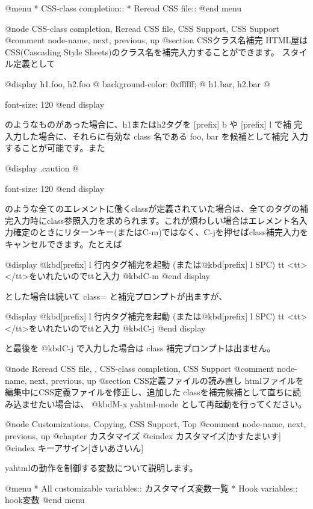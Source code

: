 @menu
* CSS-class completion::        
* Reread CSS file::             
@end menu

@node CSS-class completion, Reread CSS file, CSS Support, CSS Support
@comment  node-name,  next,  previous,  up
@section CSSクラス名補完
HTML屋はCSS(Cascading Style Sheets)のクラス名を補完入力することができます。
スタイル定義として

@display
 h1.foo, h2.foo @{ background-color: 0xffffff; @}
 h1.bar, h2.bar @{ font-size: 120%
@end display

のようなものがあった場合に、h1またはh2タグを [prefix] b や [prefix] l で補
完入力した場合に、それらに有効な class 名である foo, bar を候補として補完
入力することが可能です。また

@display
 .caution @{ font-size: 120%
@end display

のような全てのエレメントに働くclassが定義されていた場合は、全てのタグの補
完入力時にclass参照入力を求められます。これが煩わしい場合はエレメント名入
力確定のときにリターンキー(またはC-m)ではなく、C-jを押せばclass補完入力を
キャンセルできます。たとえば

@display
 @kbd{[prefix] l}                    行内タグ補完を起動
    (または@kbd{[prefix] l SPC})
 tt                                  <tt></tt>をいれたいのでttと入力
 @kbd{C-m}
@end display

とした場合は続いて class= と補完プロンプトが出ますが、

@display
 @kbd{[prefix] l}                    行内タグ補完を起動
    (または@kbd{[prefix] l SPC})
 tt                                  <tt></tt>をいれたいのでttと入力
 @kbd{C-j}
@end display

と最後を @kbd{C-j} で入力した場合は class 補完プロンプトは出ません。

@node Reread CSS file,  , CSS-class completion, CSS Support
@comment  node-name,  next,  previous,  up
@section CSS定義ファイルの読み直し
htmlファイルを編集中にCSS定義ファイルを修正し、追加した
classを補完候補として直ちに読み込ませたい場合は、
@kbd{M-x yahtml-mode} として再起動を行ってください。

@node Customizations, Copying, CSS Support, Top
@comment  node-name,  next,  previous,  up
@chapter カスタマイズ
@cindex カスタマイズ[かすたまいす]
@cindex キーアサイン[きいあさいん]

yahtmlの動作を制御する変数について説明します。

@menu
* All customizable variables::  カスタマイズ変数一覧
* Hook variables::              hook変数
@end menu

}}
